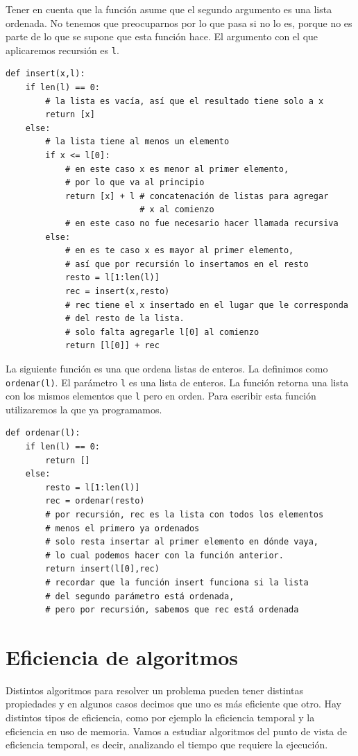 \documentclass[a4paper, 12pt]{report}
\theoremstyle{definition}
\begin{document}
Tener en cuenta que la función asume que el segundo argumento es una lista ordenada. No tenemos que preocuparnos por lo que pasa si no lo es, porque no es parte de lo que se supone que esta función hace.
El argumento con el que aplicaremos recursión es {\tt l}.
\begin{verbatim}
def insert(x,l):
    if len(l) == 0:
        # la lista es vacía, así que el resultado tiene solo a x
        return [x]
    else:
        # la lista tiene al menos un elemento
        if x <= l[0]:
            # en este caso x es menor al primer elemento,
            # por lo que va al principio
            return [x] + l # concatenación de listas para agregar
                           # x al comienzo
            # en este caso no fue necesario hacer llamada recursiva
        else:
            # en es te caso x es mayor al primer elemento,
            # así que por recursión lo insertamos en el resto
            resto = l[1:len(l)]
            rec = insert(x,resto)
            # rec tiene el x insertado en el lugar que le corresponda
            # del resto de la lista.
            # solo falta agregarle l[0] al comienzo
            return [l[0]] + rec
\end{verbatim}

La siguiente función es una que ordena listas de enteros. La definimos como {\tt ordenar(l)}. El parámetro {\tt l} es una lista de enteros. La función retorna una lista con los mismos elementos que {\tt l} pero en orden. Para escribir esta función utilizaremos la que ya programamos.
\begin{verbatim}
def ordenar(l):
    if len(l) == 0:
        return []
    else:
        resto = l[1:len(l)]
        rec = ordenar(resto)
        # por recursión, rec es la lista con todos los elementos
        # menos el primero ya ordenados
        # solo resta insertar al primer elemento en dónde vaya,
        # lo cual podemos hacer con la función anterior.
        return insert(l[0],rec)
        # recordar que la función insert funciona si la lista
        # del segundo parámetro está ordenada,
        # pero por recursión, sabemos que rec está ordenada
\end{verbatim}

\section{Eficiencia de algoritmos}

Distintos algoritmos para resolver un problema pueden tener distintas propiedades y en algunos casos decimos que uno es más eficiente que otro. Hay distintos tipos de eficiencia, como por ejemplo la eficiencia temporal y la eficiencia en uso de memoria. Vamos a estudiar algoritmos del punto de vista de eficiencia temporal, es decir, analizando el tiempo que requiere la ejecución.
\end{document}
